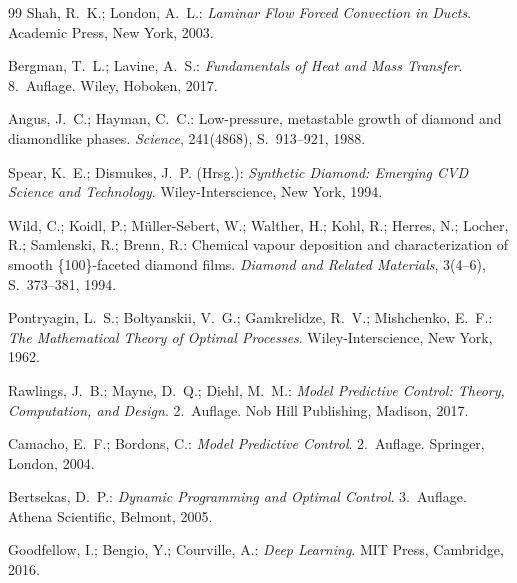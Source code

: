 ﻿\documentclass[a4paper,12pt]{article}
\theoremstyle{definition}
\begin{document}
\begin{thebibliography}{99}
Shah, R.~K.; London, A.~L.:
\textit{Laminar Flow Forced Convection in Ducts}.
Academic Press, New York, 2003.
 
Bergman, T.~L.; Lavine, A.~S.:
\textit{Fundamentals of Heat and Mass Transfer}.
8.~Auflage. Wiley, Hoboken, 2017.
 
 
Angus, J.~C.; Hayman, C.~C.:
Low-pressure, metastable growth of diamond and diamondlike phases.
\textit{Science}, 241(4868), S.~913--921, 1988.
 
Spear, K.~E.; Dismukes, J.~P. (Hrsg.):
\textit{Synthetic Diamond: Emerging CVD Science and Technology}.
Wiley-Interscience, New York, 1994.
 
Wild, C.; Koidl, P.; M{\"u}ller-Sebert, W.; Walther, H.; Kohl, R.; Herres, N.;
Locher, R.; Samlenski, R.; Brenn, R.:
Chemical vapour deposition and characterization of smooth \{100\}-faceted diamond films.
\textit{Diamond and Related Materials}, 3(4--6), S.~373--381, 1994.
 
 
Pontryagin, L.~S.; Boltyanskii, V.~G.; Gamkrelidze, R.~V.; Mishchenko, E.~F.:
\textit{The Mathematical Theory of Optimal Processes}.
Wiley-Interscience, New York, 1962.
 
Rawlings, J.~B.; Mayne, D.~Q.; Diehl, M.~M.:
\textit{Model Predictive Control: Theory, Computation, and Design}.
2.~Auflage. Nob Hill Publishing, Madison, 2017.
 
Camacho, E.~F.; Bordons, C.:
\textit{Model Predictive Control}.
2.~Auflage. Springer, London, 2004.
 
Bertsekas, D.~P.:
\textit{Dynamic Programming and Optimal Control}.
3.~Auflage. Athena Scientific, Belmont, 2005.
 
 
Goodfellow, I.; Bengio, Y.; Courville, A.:
\textit{Deep Learning}.
MIT Press, Cambridge, 2016.
 

\end{thebibliography}
\end{document}
